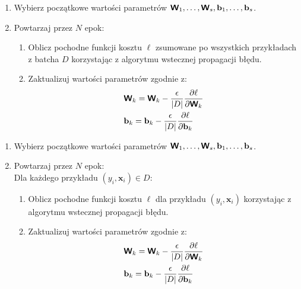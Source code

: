 \documentclass{myclass}
\begin{document}
\begin{tcolorbox}[title=Algorytm BGD]
\begin{enumerate}
    \item Wybierz początkowe wartości parametrów \(\boldsymbol{\mathsf{W}}_1, \ldots,\boldsymbol{\mathsf{W}}_s, \mathbf{b}_1,
    \ldots, \mathbf{b}_s\).
    
    \item Powtarzaj przez \(N\) epok:
    \begin{enumerate}
        \item Oblicz pochodne funkcji kosztu \(\ell\) zsumowane po wszystkich przykładach z batcha
        \(D\) korzystając z algorytmu wstecznej propagacji błędu.

        \item Zaktualizuj wartości parametrów zgodnie z:
        \begin{equation*}
            \begin{split}
                &\boldsymbol{\mathsf{W}}_k = \boldsymbol{\mathsf{W}}_k - \frac{\epsilon}{|D|}\pdv{\ell}{\boldsymbol{\mathsf{W}}_k}\\
                &\mathbf{b}_k = \mathbf{b}_k - \frac{\epsilon}{|D|}\pdv{\ell}{\mathbf{b}_k}\\
            \end{split}
        \end{equation*}
    \end{enumerate}
\end{enumerate}
\end{tcolorbox}

\begin{tcolorbox}[title=Algorytm SGD]
\begin{enumerate}
    \item Wybierz początkowe wartości parametrów \(\boldsymbol{\mathsf{W}}_1, \ldots,\boldsymbol{\mathsf{W}}_s, \mathbf{b}_1,
    \ldots, \mathbf{b}_s\).
    
    \item Powtarzaj przez \(N\) epok: \\
    Dla każdego przykładu \((y_i, \mathbf{x}_i) \in D\):
    \begin{enumerate}
        \item Oblicz pochodne funkcji kosztu \(\ell\) dla przykładu \((y_i, \mathbf{x}_i)\)
        korzystając z algorytmu wstecznej propagacji błędu.

        \item Zaktualizuj wartości parametrów zgodnie z:
        \begin{equation*}
            \begin{split}
                &\boldsymbol{\mathsf{W}}_k = \boldsymbol{\mathsf{W}}_k - \frac{\epsilon}{|D|}\pdv{\ell}{\boldsymbol{\mathsf{W}}_k}\\
                &\mathbf{b}_k = \mathbf{b}_k - \frac{\epsilon}{|D|}\pdv{\ell}{\mathbf{b}_k}\\
            \end{split}
        \end{equation*}
    \end{enumerate}

\end{enumerate}
\end{tcolorbox}
\end{document}
